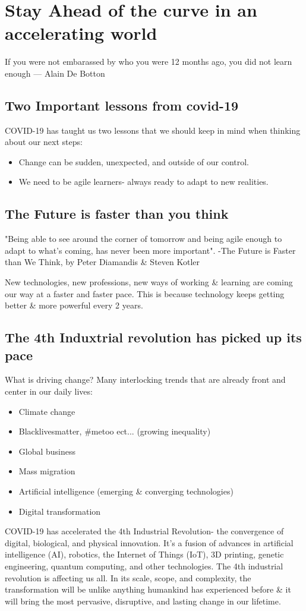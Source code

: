 \documentclass[11pt]{book} %
\begin{document}
\section{Stay Ahead of the curve in an accelerating world}
	If you were not embarassed by who you were 12 months ago, you did not learn enough --- Alain De Botton
	\subsection{Two Important lessons from covid-19}
		COVID-19 has taught us two lessons that we should keep in mind when thinking about our next steps:
		\begin{itemize}
			\item  Change can be sudden, unexpected, and outside of our control. 
			\item  We need to be agile learners- always ready to adapt to new realities.
		\end{itemize} 
	\subsection{The Future is faster than you think}
		"Being able to see around the corner of tomorrow and being agile enough to adapt to what's coming, has never been more important". 
		-The Future is Faster than We Think, by Peter Diamandis \& Steven Kotler

		New technologies, new professions, new ways of working \& learning are coming our way at a faster and faster pace. 		This is because technology keeps getting better \& more powerful every 2 years. 
	\subsection{The 4th Induxtrial revolution has picked up its pace}
		What is driving change? Many interlocking trends that are already front and center in our daily lives:
		\begin{itemize}
			\item Climate change
			\item Blacklivesmatter, \#metoo ect... (growing inequality)
			\item Global business 
			\item Mass migration 
			\item Artificial intelligence (emerging \& converging technologies)
			\item Digital transformation
		\end{itemize}
		COVID-19 has accelerated the 4th Industrial Revolution- the convergence of digital, biological, and physical innovation. It's a fusion of advances in artificial intelligence (AI), robotics, the Internet of Things (IoT), 3D printing, genetic engineering, quantum computing, and other technologies. The 4th industrial revolution is affecting us all. In its scale, scope, and complexity, the transformation will be unlike anything humankind has experienced before \& it will bring the most pervasive, disruptive, and lasting change in our lifetime.
\end{document}
